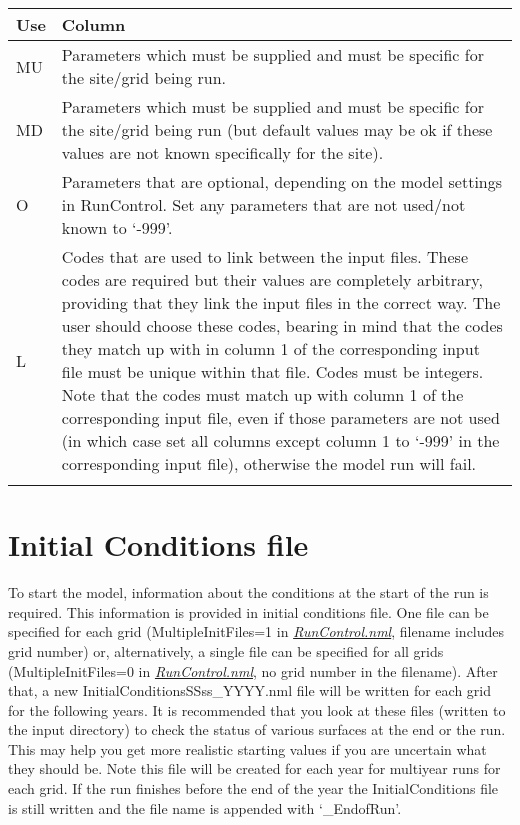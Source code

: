 \documentclass[letterpaper,10pt,english]{sphinxmanual}
\begin{document}
\begin{savenotes}\sphinxattablestart
\centering
\begin{tabulary}{\linewidth}[t]{|T|T|}
\hline
\sphinxstyletheadfamily 
Use
&\sphinxstyletheadfamily 
Column
\\
\hline
MU
&
Parameters which must be supplied
and must be specific for the
site/grid being run.
\\
\hline
MD
&
Parameters which must be supplied
and must be specific for the
site/grid being run (but default
values may be ok if these values
are not known specifically for
the site).
\\
\hline
O
&
Parameters that are optional,
depending on the model settings
in RunControl. Set any parameters
that are not used/not known to
‘-999’.
\\
\hline
L
&
Codes that are used to link
between the input files. These
codes are required but their
values are completely arbitrary,
providing that they link the
input files in the correct way.
The user should choose these
codes, bearing in mind that the
codes they match up with in
column 1 of the corresponding
input file must be unique within
that file. Codes must be
integers. Note that the codes
must match up with column 1 of
the corresponding input file,
even if those parameters are not
used (in which case set all
columns except column 1 to ‘-999’
in the corresponding input file),
otherwise the model run will
fail.
\\
\hline&\\
\hline
\end{tabulary}
\par
\sphinxattableend\end{savenotes}


\section{Initial Conditions file}
\label{\detokenize{input_files/Initial_Conditions::doc}}\label{\detokenize{input_files/Initial_Conditions:initial-conditions-file}}
To start the model, information about the conditions at the start of the
run is required. This information is provided in initial conditions
file. One file can be specified for each grid (MultipleInitFiles=1 in
{\hyperref[\detokenize{input_files/Initial_Conditions:RunControl.nml}]{\emph{RunControl.nml}}}, filename includes grid number) or,
alternatively, a single file can be specified for all grids
(MultipleInitFiles=0 in {\hyperref[\detokenize{input_files/Initial_Conditions:RunControl.nml}]{\emph{RunControl.nml}}}, no grid
number in the filename). After that, a new
InitialConditionsSSss\_YYYY.nml file will be written for each grid for
the following years. It is recommended that you look at these files
(written to the input directory) to check the status of various surfaces
at the end or the run. This may help you get more realistic starting
values if you are uncertain what they should be. Note this file will be
created for each year for multiyear runs for each grid. If the run
finishes before the end of the year the InitialConditions file is still
written and the file name is appended with ‘\_EndofRun’.
\end{document}
